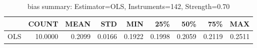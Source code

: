 \begin{table}[ht]
\centering
\caption{bias summary: Estimator=OLS, Instruments=142, Strength=0.70}
\begin{tabular}{lrrrrrrrr}
\toprule
 & COUNT & MEAN & STD & MIN & 25\% & 50\% & 75\% & MAX \\
\midrule
OLS & 10.0000 & 0.2099 & 0.0166 & 0.1922 & 0.1998 & 0.2059 & 0.2119 & 0.2511 \\
\bottomrule
\end{tabular}
\end{table}
